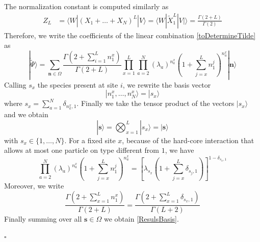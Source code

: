 \documentclass[11pt]{article}
\numberwithin{equation}{section}
\numberwithin{equation}{subsection}
\begin{document}
The normalization constant is computed similarly as 
\begin{align*}
	Z_{L}&=\langle W|(X_{1}+\ldots+X_{N})^{L}|V\rangle=\langle W|\widetilde{X}_{1}^{L}|V|\rangle=
	\frac{\Gamma(2+L)}{\Gamma(2)}
\end{align*}
Therefore, we write the coefficients of the linear combination \eqref{toDetermineTilde} as 
\begin{equation}\label{resulEsteady}
	|\widetilde{\Psi}\rangle= \sum_{\mathbf{n}\in \Omega}\frac{\Gamma(2+\sum_{i=1}^{L}n_{1}^{x})}{\Gamma(2+L)}\prod_{x=1}^{L}\prod_{a=2}^{N}\left(\lambda_{a}\right)^{n_{a}^{x}}\left(1+\sum_{j=x}^{L}n_{1}^{j}\right)^{n_{a}^{x}}|\mathbf{n}\rangle
\end{equation}
Calling $s_{x}$ the species present at site $i$, we rewrite the basis vector 
\begin{equation}
	|n_{1}^{x},\ldots,n_{N}^{x}\rangle=|s_{x}\rangle
\end{equation}
where $s_{x}=\sum_{a=1}^N\delta_{n_{k}^{x},1}$. Finally we take the tensor product of the vectors $|s_{x}\rangle$ and we obtain
\begin{equation}
	|\mathbf{s}\rangle=\bigotimes_{x=1}^{L}|s_{x}\rangle=|\mathbf{s}\rangle
\end{equation}
with $s_{x}\in\{1,\ldots,N\}$. For a fixed site $x$, because of the hard-core interaction that allows at most one particle on type different from $1$, we have 
\begin{equation}
	\prod_{a=2}^{N}\left(\lambda_{a}\right)^{n_{a}^{x}}\left(1+\sum_{j=x}^{L}n_{1}^{j}\right)^{n_{a}^{x}}=\left[\lambda_{s_{x}}\left(1+\sum_{j=x}^{L}\delta_{s_{j},1}\right)\right]^{1-\delta_{s_{x},1}}
\end{equation}
Moreover, we write 
\begin{equation}
	\frac{\Gamma(2+\sum_{x=1}^{L}n_{1}^{x})}{\Gamma(2+L)}=\frac{\Gamma\left(2+\sum_{x=1}^{L}\delta_{s_{x},1}\right)}{\Gamma\left(L+2\right)}
\end{equation}
Finally summing over all $\mathbf{s}\in \Omega$  we obtain \eqref{ResulsBasis}.
\begin{flushright}
$\square$
\end{flushright}
\end{document}
